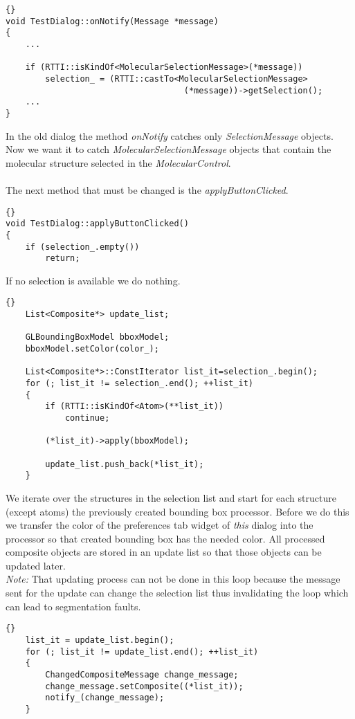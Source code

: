 \begin{lstlisting}{}
void TestDialog::onNotify(Message *message)
{
	...

	if (RTTI::isKindOf<MolecularSelectionMessage>(*message))
		selection_ = (RTTI::castTo<MolecularSelectionMessage>
									(*message))->getSelection();
	...
}
\end{lstlisting}

In the old dialog the method {\em onNotify} catches only {\em SelectionMessage} objects.
Now we want it to catch {\em MolecularSelectionMessage} objects that contain the 
molecular structure selected in the {\em MolecularControl}.\\ \\
The next method that must be changed is the {\em applyButtonClicked}.

\begin{lstlisting}{}
void TestDialog::applyButtonClicked()
{
	if (selection_.empty())
		return;
\end{lstlisting}

If no selection is available we do nothing.

\begin{lstlisting}{}
	List<Composite*> update_list;

	GLBoundingBoxModel bboxModel;
	bboxModel.setColor(color_);

	List<Composite*>::ConstIterator list_it=selection_.begin();
	for (; list_it != selection_.end(); ++list_it)
	{
		if (RTTI::isKindOf<Atom>(**list_it))
			continue;
		
		(*list_it)->apply(bboxModel);
		
		update_list.push_back(*list_it);
	}
\end{lstlisting}

We iterate over the structures in the selection list and start for each
structure (except atoms) the previously created bounding box processor. Before we
do this we transfer the color of the preferences tab widget of {\em *this} dialog
into the processor so that created bounding box has the needed color.
All processed composite objects are stored in an update list so that those objects
can be updated later. \\
{\em Note: } That updating process can not be done in this loop because
the message sent for the update can change the selection list thus invalidating
the loop which can lead to segmentation faults. 
	
\begin{lstlisting}{}
	list_it = update_list.begin();
	for (; list_it != update_list.end(); ++list_it)
	{
		ChangedCompositeMessage change_message;
		change_message.setComposite((*list_it));
		notify_(change_message);
	}
\end{lstlisting}

